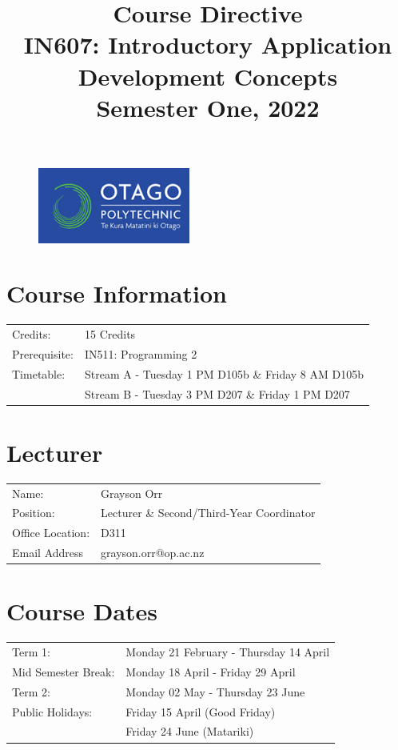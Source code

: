 \documentclass{article}
\author{}
\begin{document}
 

\begin{figure}
	\includegraphics[width=50mm]{../img/logo.png} 
\end{figure}

\title{Course Directive\\IN607: Introductory Application Development Concepts\\Semester One, 2022}
\date{}
\maketitle

\section*{Course Information}
\begin{tabular}{ll}
	Credits:            & 15 Credits                             \\
	Prerequisite:       & IN511: Programming 2                   \\
	Timetable:  & Stream A - Tuesday 1 PM D105b \& Friday 8 AM D105b  \\    
	  			& Stream B - Tuesday 3 PM D207 \& Friday 1 PM D207  \\   
\end{tabular} 

\section*{Lecturer}
\begin{tabular}{ll}
	Name:            & Grayson Orr                            \\
	Position:       & Lecturer \& Second/Third-Year Coordinator                   \\
	Office Location:  & D311  \\    
	Email Address  & grayson.orr@op.ac.nz  \\   
\end{tabular}

\section*{Course Dates}
\begin{tabular}{ll} 
	Term 1:             & Monday 21 February - Thursday 14 April  \\
	Mid Semester Break: & Monday 18 April - Friday 29 April    \\
	Term 2:             & Monday 02 May - Thursday 23 June    \\
	Public Holidays:   & Friday 15 April (Good Friday) \\
	& Friday 24 June (Matariki)
\end{tabular}
\end{document}
